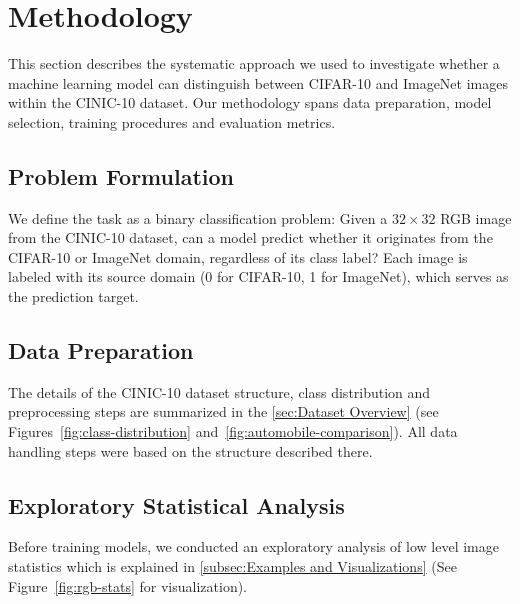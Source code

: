 \section{Methodology}

This section describes the systematic approach we used to investigate whether a machine learning model can distinguish between CIFAR-10 and 
ImageNet images within the CINIC-10 dataset. Our methodology spans data preparation, model selection, training procedures and evaluation metrics.

\subsection{Problem Formulation}
We define the task as a binary classification problem: Given a $32 \times 32$ RGB image from the CINIC-10 dataset, can a model predict whether it 
originates from the CIFAR-10 or ImageNet domain, regardless of its class label? Each image is labeled with its source domain (0 for CIFAR-10, 1 for 
ImageNet), which serves as the prediction target.

\subsection{Data Preparation}
The details of the CINIC-10 dataset structure, class distribution and preprocessing steps are summarized in the \autoref{sec:Dataset Overview} (see Figures~\ref{fig:class-distribution} and~\ref{fig:automobile-comparison}). 
All data handling steps were based on the structure described there.

\subsection{Exploratory Statistical Analysis}
Before training models, we conducted an exploratory analysis of low level image statistics which is explained in \autoref{subsec:Examples and Visualizations}
(See Figure~\ref{fig:rgb-stats} for visualization).

